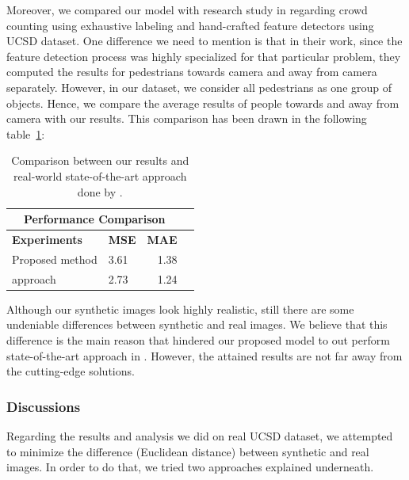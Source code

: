 \noindent Moreover, we compared our model with \citeauthor*{chan2008privacy} research study in \cite{chan2008privacy} regarding crowd counting using exhaustive labeling and hand-crafted feature detectors using UCSD dataset. One difference we need to mention is that in their work, since the feature detection process was highly specialized for that particular problem, they computed the results for pedestrians towards camera and away from camera separately. However, in our dataset, we consider all pedestrians as one group of objects. Hence, we compare the average results of people towards and away from camera with our results. This comparison has been drawn in the following table~\ref{finalres}:

\begin{table}[H]
\centering
\small\sffamily
\begin{tabular}{llrr}
\multicolumn{3}{c}{\textbf{\textbf{Performance Comparison}}} \\
\bottomrule
\textbf{Experiments} &\textbf{MSE} &\textbf{MAE} \\
\bottomrule
Proposed method                  &  3.61 & 1.38      \\
\citet{chan2008privacy} approach &  2.73 & 1.24      \\
\bottomrule
\end{tabular}
\caption{Comparison between our results and real-world state-of-the-art approach done by \citet{chan2008privacy}.}
\label{finalres}
\end{table} 

 Although our synthetic images look highly realistic, still there are some undeniable differences between synthetic and real images. We believe that this difference is the main reason that hindered our proposed model to out perform state-of-the-art approach in \cite{chan2008privacy}. However, the attained results are not far away from the cutting-edge solutions.
 
\subsubsection{Discussions}

Regarding the results and analysis we did on real UCSD dataset, we attempted to minimize the difference (Euclidean distance) between synthetic and real images. In order to do that, we tried two approaches explained underneath. 

